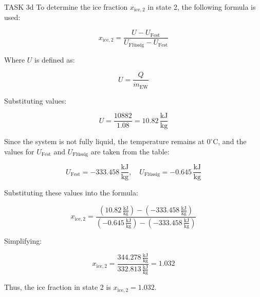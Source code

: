 TASK 3d  
To determine the ice fraction \( x_{\text{ice},2} \) in state 2, the following formula is used:  

\[
x_{\text{ice},2} = \frac{U - U_{\text{Fest}}}{U_{\text{Flüssig}} - U_{\text{Fest}}}
\]  

Where \( U \) is defined as:  

\[
U = \frac{Q}{\dot{m}_{\text{EW}}}
\]  

Substituting values:  

\[
U = \frac{10882}{1.08} = 10.82 \, \frac{\text{kJ}}{\text{kg}}
\]  

Since the system is not fully liquid, the temperature remains at \( 0^\circ\text{C} \), and the values for \( U_{\text{Fest}} \) and \( U_{\text{Flüssig}} \) are taken from the table:  

\[
U_{\text{Fest}} = -333.458 \, \frac{\text{kJ}}{\text{kg}}, \quad U_{\text{Flüssig}} = -0.645 \, \frac{\text{kJ}}{\text{kg}}
\]  

Substituting these values into the formula:  

\[
x_{\text{ice},2} = \frac{(10.82 \, \frac{\text{kJ}}{\text{kg}}) - (-333.458 \, \frac{\text{kJ}}{\text{kg}})}{(-0.645 \, \frac{\text{kJ}}{\text{kg}}) - (-333.458 \, \frac{\text{kJ}}{\text{kg}})}
\]  

Simplifying:  

\[
x_{\text{ice},2} = \frac{344.278 \, \frac{\text{kJ}}{\text{kg}}}{332.813 \, \frac{\text{kJ}}{\text{kg}}} = 1.032
\]  

Thus, the ice fraction in state 2 is \( x_{\text{ice},2} = 1.032 \).